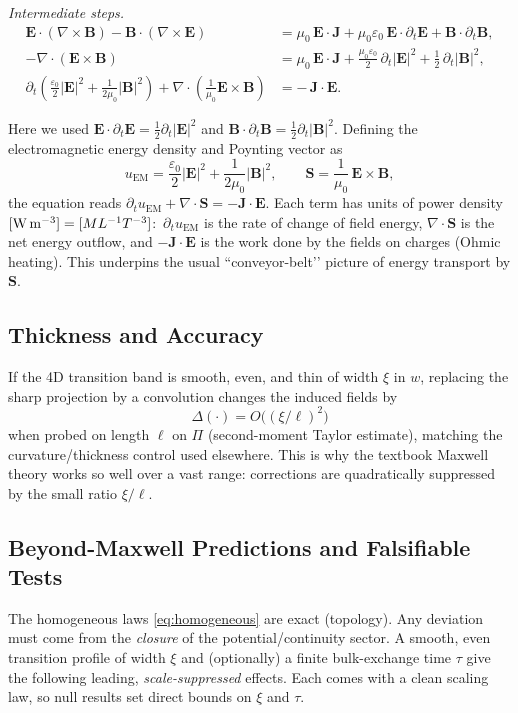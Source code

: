 \medskip
\noindent\emph{Intermediate steps.}
\begin{align}
\mathbf{E}\!\cdot(\nabla\times\mathbf{B})-\mathbf{B}\!\cdot(\nabla\times\mathbf{E})
&=\mu_{0}\,\mathbf{E}\!\cdot\mathbf{J}
+\mu_{0}\varepsilon_{0}\,\mathbf{E}\!\cdot\partial_{t}\mathbf{E}
+\mathbf{B}\!\cdot\partial_{t}\mathbf{B},
\\
-\nabla\!\cdot(\mathbf{E}\times\mathbf{B})
&=\mu_{0}\,\mathbf{E}\!\cdot\mathbf{J}
+\frac{\mu_{0}\varepsilon_{0}}{2}\,\partial_{t}|\mathbf{E}|^{2}
+\frac{1}{2}\,\partial_{t}|\mathbf{B}|^{2},
\\
\partial_{t}\!\left(\frac{\varepsilon_{0}}{2}|\mathbf{E}|^{2}
+\frac{1}{2\mu_{0}}|\mathbf{B}|^{2}\right)
+\nabla\!\cdot\!\left(\frac{1}{\mu_{0}}\mathbf{E}\times\mathbf{B}\right)
&=-\,\mathbf{J}\!\cdot\mathbf{E}.
\end{align}

\noindent
Here we used $\mathbf{E}\!\cdot\partial_{t}\mathbf{E}=\tfrac12\partial_{t}|\mathbf{E}|^{2}$ and
$\mathbf{B}\!\cdot\partial_{t}\mathbf{B}=\tfrac12\partial_{t}|\mathbf{B}|^{2}$.
Defining the electromagnetic energy density and Poynting vector as
\[
u_{\mathrm{EM}}=\frac{\varepsilon_{0}}{2}|\mathbf{E}|^{2}+\frac{1}{2\mu_{0}}|\mathbf{B}|^{2},
\qquad
\mathbf{S}=\frac{1}{\mu_{0}}\,\mathbf{E}\times\mathbf{B},
\]
the equation reads $\partial_{t}u_{\mathrm{EM}}+\nabla\!\cdot\mathbf{S}=-\mathbf{J}\!\cdot\mathbf{E}$.
Each term has units of power density $[{\rm W\,m^{-3}}]=[M L^{-1}T^{-3}]$:
$\,\partial_{t}u_{\mathrm{EM}}$ is the rate of change of field energy,
$\nabla\!\cdot\mathbf{S}$ is the net energy outflow, and
$-\mathbf{J}\!\cdot\mathbf{E}$ is the work done by the fields on charges (Ohmic heating).
This underpins the usual “conveyor-belt’’ picture of energy transport by $\mathbf{S}$.

\subsection{Thickness and Accuracy}
If the 4D transition band is smooth, even, and thin of width $\xi$ in $w$, replacing the sharp projection by a convolution changes the induced fields by
\[
\Delta(\cdot)=O\!\big((\xi/\ell)^2\big)
\]
when probed on length $\ell$ on $\Pi$ (second-moment Taylor estimate), matching the curvature/thickness control used elsewhere. This is why the textbook Maxwell theory works so well over a vast range: corrections are quadratically suppressed by the small ratio $\xi/\ell$.

\subsection{Beyond-Maxwell Predictions and Falsifiable Tests}
\label{subsec:EM_predictions}
The homogeneous laws \eqref{eq:homogeneous} are exact (topology). Any deviation must come from the \emph{closure} of the potential/continuity sector. A smooth, even transition profile of width $\xi$ and (optionally) a finite bulk-exchange time $\tau$ give the following leading, \emph{scale-suppressed} effects. Each comes with a clean scaling law, so null results set direct bounds on $\xi$ and $\tau$.

